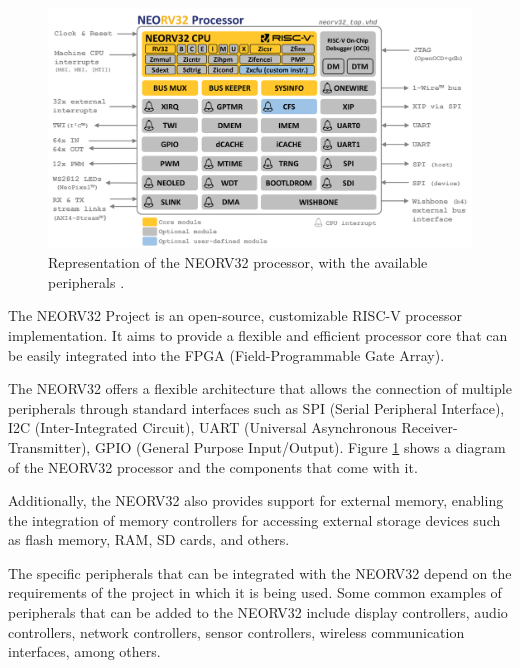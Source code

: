         \begin{figure}[!t]
            \begin{center}
                \includegraphics[width=1\textwidth]{figures/neorv32_processor.png}
                \caption{\label{fig:neorv32_peripherals} Representation of the NEORV32 processor, with the available peripherals \cite{nolting_2022}.}
            \end{center}
        \end{figure}
    
        The NEORV32 Project is an open-source, customizable RISC-V processor implementation. It aims to provide a flexible and efficient processor core that can be easily integrated into the FPGA (Field-Programmable Gate Array).
        
        The NEORV32 offers a flexible architecture that allows the connection of multiple peripherals through standard interfaces such as SPI (Serial Peripheral Interface), I2C (Inter-Integrated Circuit), UART (Universal Asynchronous Receiver-Transmitter), GPIO (General Purpose Input/Output). Figure \ref{fig:neorv32_peripherals} shows a diagram of the NEORV32 processor and the components that come with it.
        
        Additionally, the NEORV32 also provides support for external memory, enabling the integration of memory controllers for accessing external storage devices such as flash memory, RAM, SD cards, and others.
        
        The specific peripherals that can be integrated with the NEORV32 depend on the requirements of the project in which it is being used. Some common examples of peripherals that can be added to the NEORV32 include display controllers, audio controllers, network controllers, sensor controllers, wireless communication interfaces, among others.